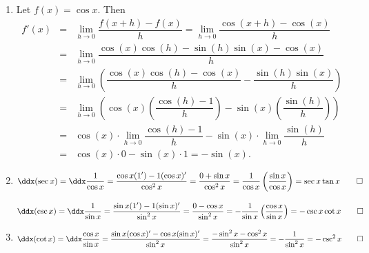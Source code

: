 \documentclass{book}
\newcommand{\ddydxdx}{\dfrac{d^2y}{dx^2}}
\begin{document}
\begin{appendices}
\begin{enumerate}[!HW!]
\item 
\begin{pf}
Let $f(x) = \cos x$. Then 
\begin{eqnarray*}
f'(x) &=& \lim_{h\to 0} \dfrac{f(x+h) - f(x)}{h} = \lim_{h\to 0} \dfrac{\cos(x+h) - \cos(x)}{h}\\
&=& \lim_{h\to 0} \dfrac{\cos(x)\cos(h) - \sin(h)\sin(x) - \cos(x)}{h}\\
&=& \lim_{h\to 0} \left(\dfrac{\cos(x)\cos(h) - \cos(x)}{h} - \dfrac{\sin(h)\sin(x)}{h}\right)\\
&=& \lim_{h\to 0} \left(\cos(x)\left(\dfrac{\cos(h) - 1}{h}\right) - \sin(x)\left(\dfrac{\sin(h)}{h}\right)\right)\\
&=& \cos(x)\cdot \lim_{h\to 0} \dfrac{\cos(h) - 1}{h} - \sin(x)\cdot \lim_{h\to 0}\dfrac{\sin(h)}{h}\\
&=& \cos(x) \cdot 0 - \sin(x) \cdot 1  = -\sin(x).
\end{eqnarray*} 
\end{pf}
\item \begin{pf}
\begin{multline*} \ddx(\sec x) = \ddx\dfrac{1}{\cos x} = \dfrac{\cos x(1') - 1(\cos x)'}{\cos^2x} = \dfrac{0+\sin x}{\cos^2x} = \dfrac{1}{\cos x}\left(\dfrac{\sin x}{\cos x}\right) = \sec x\tan x \qedhere\end{multline*}
\end{pf}  
\itemspade 
\begin{pf}
\begin{multline*} \ddx(\csc x) = \ddx\dfrac{1}{\sin x} = \dfrac{\sin x(1') - 1(\sin x)'}{\sin^2x} = \dfrac{0-\cos x}{\sin^2x}= -\dfrac{1}{\sin x}\left(\dfrac{\cos x}{\sin x}\right) = -\csc x\cot x \qedhere\end{multline*}
\end{pf}
\item \begin{pf}
\begin{multline*}
\ddx(\cot x) = \ddx\dfrac{\cos x}{\sin x} = \dfrac{\sin x(\cos x)' - \cos x(\sin x)'}{\sin^2x} = \dfrac{-\sin^2 x-\cos^2 x}{\sin^2x} = -\dfrac{1}{\sin^2 x} = -\csc^2 x \qedhere\end{multline*}
\end{pf}  
\end{enumerate}
\vspace{-15pt}



\end{appendices}
\end{document}

